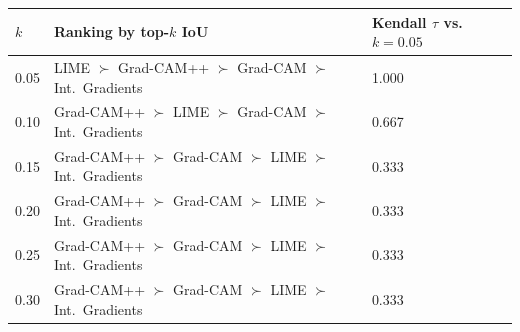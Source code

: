 \begin{tabular}{lll}
\toprule
\textbf{$k$} & \textbf{Ranking by top-$k$ IoU} & \textbf{Kendall $\tau$ vs.\ $k=0.05$} \\
\midrule
0.05 & LIME $\succ$ Grad-CAM++ $\succ$ Grad-CAM $\succ$ Int.\ Gradients & 1.000 \\
0.10 & Grad-CAM++ $\succ$ LIME $\succ$ Grad-CAM $\succ$ Int.\ Gradients & 0.667 \\
0.15 & Grad-CAM++ $\succ$ Grad-CAM $\succ$ LIME $\succ$ Int.\ Gradients & 0.333 \\
0.20 & Grad-CAM++ $\succ$ Grad-CAM $\succ$ LIME $\succ$ Int.\ Gradients & 0.333 \\
0.25 & Grad-CAM++ $\succ$ Grad-CAM $\succ$ LIME $\succ$ Int.\ Gradients & 0.333 \\
0.30 & Grad-CAM++ $\succ$ Grad-CAM $\succ$ LIME $\succ$ Int.\ Gradients & 0.333 \\
\bottomrule
\end{tabular}
